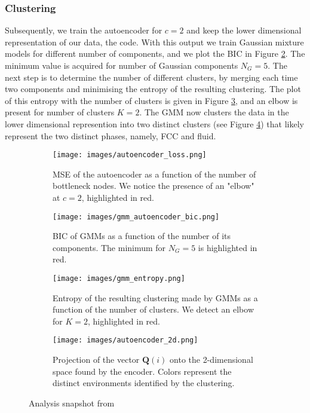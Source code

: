 \documentclass{article}
\begin{document}
\subsubsection{Clustering}
Subsequently, we train the autoencoder for $c=2$ and keep the lower dimensional representation of our data, the code. With this output we train Gaussian mixture models for different number of components, and we plot the BIC in Figure \ref{fig:ae_bic}. The minimum value is acquired for number of Gaussian components $N_G=5$. The next step is to determine the number of different clusters, by merging each time two components and minimising the entropy of the resulting clustering. The plot of this entropy with the number of clusters is given in Figure \ref{fig:se_entropy}, and an elbow is present for number of clusters $K=2$. The GMM now clusters the data in the lower dimensional represention into two distinct clusters (see Figure \ref{fig:clust_code}) that likely represent the two distinct phases,  namely, FCC and fluid.

\begin{figure}[!htbp]
  \centering
  \begin{subfigure}{0.45\textwidth}
    \centering
    \texttt{[image: images/autoencoder\_loss.png]}
    \caption{MSE of the autoencoder as a function of the number of bottleneck nodes. We notice the presence of an "elbow" at $c=2$, highlighted in red.}
    \label{fig:ae_loss_function}
  \end{subfigure}
  \hfill
  \begin{subfigure}{0.45\textwidth}
    \centering
    \texttt{[image: images/gmm\_autoencoder\_bic.png]}
    \caption{BIC of GMMs as a function of the number of its components. The minimum for $N_G=5$ is highlighted in red.}
    \label{fig:ae_bic}
  \end{subfigure}

  \vspace{1cm}

  \begin{subfigure}{0.45\textwidth}
    \centering
    \texttt{[image: images/gmm\_entropy.png]}
    \caption{Entropy of the resulting clustering made by GMMs as a function of the number of clusters. We detect an elbow for $K=2$, highlighted in red.}
    \label{fig:se_entropy}
  \end{subfigure}
  \hfill
  \begin{subfigure}{0.45\textwidth}
    \centering
    \texttt{[image: images/autoencoder\_2d.png]}
    \caption{Projection of the vector $\bm{Q}(i)$ onto the 2-dimensional space found by the encoder. Colors represent the distinct environments identified by the clustering.}
    \label{fig:clust_code}
  \end{subfigure}
  
  \caption{Analysis snapshot from }
  \label{fig:overall}
\end{figure}
\end{document}
